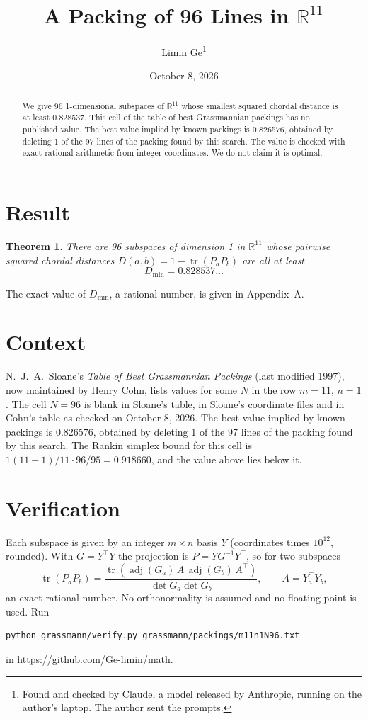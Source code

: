 \documentclass[11pt,a4paper]{article}
\title{A Packing of 96 Lines in $\mathbb{R}^{11}$}
\author{Limin Ge\thanks{Found and checked by Claude, a model released by Anthropic, running on the author's laptop. The author sent the prompts.}}
\date{October 8, 2026}
\newtheorem*{theorem}{Theorem}
\begin{document}
\maketitle
\begin{abstract}
We give 96 1-dimensional subspaces of $\mathbb{R}^{11}$ whose smallest squared chordal distance is at least 0.828537. This cell of the table of best Grassmannian packings has no published value. The best value implied by known packings is 0.826576, obtained by deleting 1 of the 97 lines of the packing found by this search. The value is checked with exact rational arithmetic from integer coordinates. We do not claim it is optimal.
\end{abstract}

\section{Result}
\begin{theorem}
There are 96 subspaces of dimension 1 in $\mathbb{R}^{11}$ whose pairwise squared chordal distances $D(a,b) = 1 - \operatorname{tr}(P_aP_b)$ are all at least
\[ D_{\min} = 0.828537\ldots \]
\end{theorem}
The exact value of $D_{\min}$, a rational number, is given in Appendix~A.


\section{Context}
N.~J.~A.~Sloane's \emph{Table of Best Grassmannian Packings} (last modified 1997), now maintained by Henry Cohn, lists values for some $N$ in the row $m=11$, $n=1$. The cell $N=96$ is blank in Sloane's table, in Sloane's coordinate files and in Cohn's table as checked on October 8, 2026. The best value implied by known packings is 0.826576, obtained by deleting 1 of the 97 lines of the packing found by this search. The Rankin simplex bound for this cell is $1(11-1)/11\cdot 96/95 = 0.918660$, and the value above lies below it.


\section{Verification}
Each subspace is given by an integer $m\times n$ basis $Y$ (coordinates times $10^{12}$, rounded). With $G=Y^\top Y$ the projection is $P=YG^{-1}Y^\top$, so for two subspaces
\[ \operatorname{tr}(P_aP_b)=\frac{\operatorname{tr}(\operatorname{adj}(G_a)\,A\,\operatorname{adj}(G_b)\,A^\top)}{\det G_a\det G_b},\qquad A=Y_a^\top Y_b, \]
an exact rational number. No orthonormality is assumed and no floating point is used. Run
\begin{verbatim}
python grassmann/verify.py grassmann/packings/m11n1N96.txt
\end{verbatim}
in \url{https://github.com/Ge-limin/math}.
\end{document}

